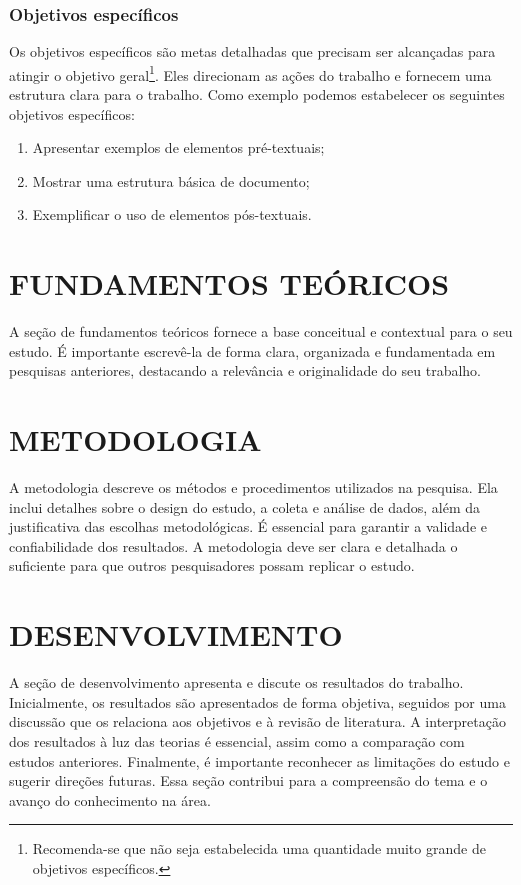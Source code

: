 \documentclass[artigo,times,capa]{iftex2024}
\begin{document}
\subsubsection{Objetivos específicos}

Os objetivos específicos são metas detalhadas que precisam ser alcançadas para atingir o objetivo geral\footnote{Recomenda-se que não seja estabelecida uma quantidade muito grande de objetivos específicos.}.
Eles direcionam as ações do trabalho e fornecem uma estrutura clara para o trabalho.
Como exemplo podemos estabelecer os seguintes objetivos específicos:
\begin{enumerate}
 \item Apresentar exemplos de elementos pré-textuais;
 \item Mostrar uma estrutura básica de documento;
 \item Exemplificar o uso de elementos pós-textuais.
\end{enumerate}

\section{FUNDAMENTOS TEÓRICOS}

A seção de fundamentos teóricos fornece a base conceitual e contextual para o seu estudo.
É importante escrevê-la de forma clara, organizada e fundamentada em pesquisas anteriores, destacando a relevância e originalidade do seu trabalho.

\section{METODOLOGIA}

A metodologia descreve os métodos e procedimentos utilizados na pesquisa.
Ela inclui detalhes sobre o design do estudo, a coleta e análise de dados, além da justificativa das escolhas metodológicas.
É essencial para garantir a validade e confiabilidade dos resultados.
A metodologia deve ser clara e detalhada o suficiente para que outros pesquisadores possam replicar o estudo.

\section{DESENVOLVIMENTO}

A seção de desenvolvimento apresenta e discute os resultados do trabalho.
Inicialmente, os resultados são apresentados de forma objetiva, seguidos por uma discussão que os relaciona aos objetivos e à revisão de literatura.
A interpretação dos resultados à luz das teorias é essencial, assim como a comparação com estudos anteriores.
Finalmente, é importante reconhecer as limitações do estudo e sugerir direções futuras.
Essa seção contribui para a compreensão do tema e o avanço do conhecimento na área.
\end{document}
